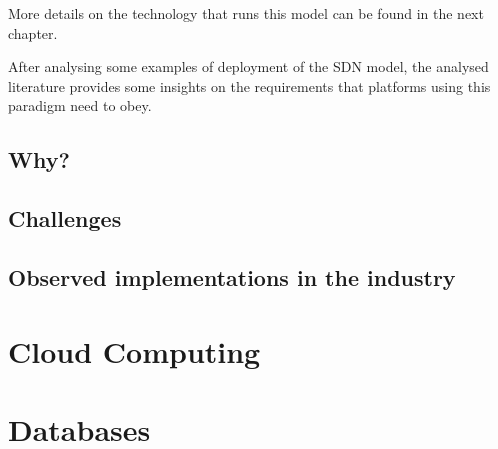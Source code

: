 \par More details on the technology that runs this model can be found in the next chapter. 
\par After analysing some examples of deployment of the SDN model, the analysed literature provides some insights on the requirements that platforms using this paradigm need to obey. 
 

\subsection {Why?}
\subsection {Challenges}
\subsection {Observed implementations in the industry}

\section {Cloud Computing}
\section {Databases} 

